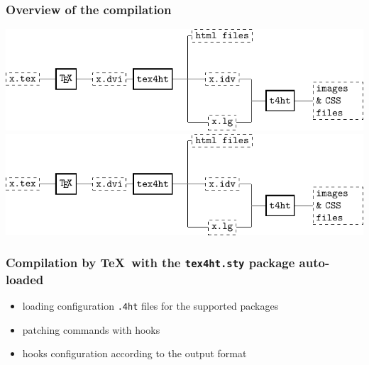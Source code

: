
\begin{frame}
  \frametitle{Overview of the compilation}
  \ifdefined\HCode
      \includegraphics[width=600px]{img/tex4ht_process}
  \else
      \includegraphics[width=\textwidth]{img/tex4ht_process}
  \fi
\end{frame}

\begin{frame}
  \frametitle{Compilation by \TeX\ with the \texttt{tex4ht.sty} package auto-loaded}
  \begin{itemize}
    \item loading configuration \texttt{.4ht} files for the supported packages
    \item patching commands with hooks 
    \item hooks configuration according to the output format
  \end{itemize}
\end{frame}

